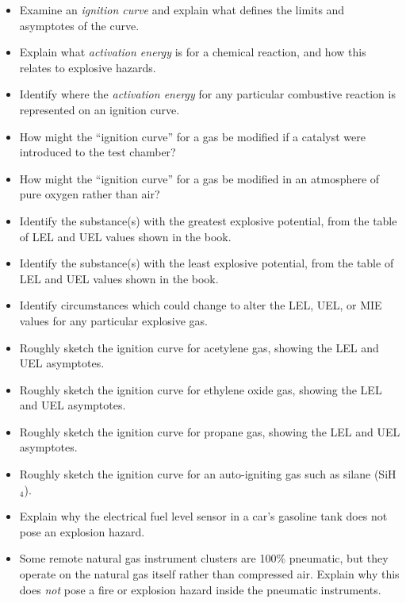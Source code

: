 \begin{itemize}
\item{} Examine an {\it ignition curve} and explain what defines the limits and asymptotes of the curve.
\item{} Explain what {\it activation energy} is for a chemical reaction, and how this relates to explosive hazards.
\item{} Identify where the {\it activation energy} for any particular combustive reaction is represented on an ignition curve.
\item{} How might the ``ignition curve'' for a gas be modified if a catalyst were introduced to the test chamber?
\item{} How might the ``ignition curve'' for a gas be modified in an atmosphere of pure oxygen rather than air?
\item{} Identify the substance(s) with the greatest explosive potential, from the table of LEL and UEL values shown in the book.
\item{} Identify the substance(s) with the least explosive potential, from the table of LEL and UEL values shown in the book.
\item{} Identify circumstances which could change to alter the LEL, UEL, or MIE values for any particular explosive gas.
\item{} Roughly sketch the ignition curve for acetylene gas, showing the LEL and UEL asymptotes.
\item{} Roughly sketch the ignition curve for ethylene oxide gas, showing the LEL and UEL asymptotes.
\item{} Roughly sketch the ignition curve for propane gas, showing the LEL and UEL asymptotes.
\item{} Roughly sketch the ignition curve for an auto-igniting gas such as silane (SiH$_{4}$).
\item{} Explain why the electrical fuel level sensor in a car's gasoline tank does not pose an explosion hazard.
\item{} Some remote natural gas instrument clusters are 100\% pneumatic, but they operate on the natural gas itself rather than compressed air.  Explain why this does {\it not} pose a fire or explosion hazard inside the pneumatic instruments.
\end{itemize}




